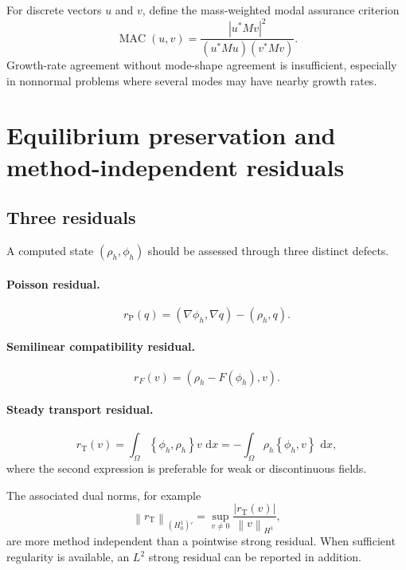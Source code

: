\documentclass[11pt,a4paper]{article}
\newcommand{\Om}{\Omega}
\newcommand{\dd}{\,\mathrm{d}}
\newcommand{\bracket}[2]{\left\{#1,#2\right\}}
\newcommand{\norm}[1]{\left\|#1\right\|}
\newcommand{\abs}[1]{\left|#1\right|}
\begin{document}
For discrete vectors $u$ and $v$, define the mass-weighted modal assurance criterion
\begin{equation}
  \operatorname{MAC}(u,v)
  =\frac{\abs{u^\ast Mv}^2}
  {(u^\ast Mu)(v^\ast Mv)}.
  \label{eq:mac}
\end{equation}
Growth-rate agreement without mode-shape agreement is insufficient, especially in nonnormal problems where several modes may have nearby growth rates.

\section{Equilibrium preservation and method-independent residuals}

\subsection{Three residuals}

A computed state $(\rho_h,\phi_h)$ should be assessed through three distinct defects.

\paragraph{Poisson residual.}
\begin{equation}
  r_{\mathrm P}(q)
  =(\nabla\phi_h,\nabla q)-(\rho_h,q).
  \label{eq:poisson-weak-residual}
\end{equation}

\paragraph{Semilinear compatibility residual.}
\begin{equation}
  r_F(v)
  =(\rho_h-F(\phi_h),v).
  \label{eq:F-residual}
\end{equation}

\paragraph{Steady transport residual.}
\begin{equation}
  r_{\mathrm T}(v)
  =\int_\Om\bracket{\phi_h}{\rho_h}v\,\dd x
  =-\int_\Om\rho_h\bracket{\phi_h}{v}\,\dd x,
  \label{eq:transport-residual}
\end{equation}
where the second expression is preferable for weak or discontinuous fields.

The associated dual norms, for example
\begin{equation}
  \norm{r_{\mathrm T}}_{(H_0^1)'}
  =\sup_{v\neq0}
  \frac{\abs{r_{\mathrm T}(v)}}{\norm{v}_{H^1}},
  \label{eq:dual-transport-norm}
\end{equation}
are more method independent than a pointwise strong residual. When sufficient regularity is available, an $L^2$ strong residual can be reported in addition.
\end{document}
